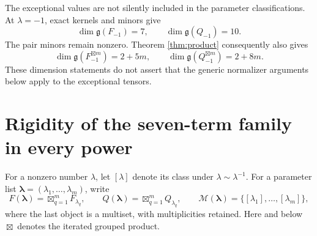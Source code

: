 \documentclass[11pt]{article}
\theoremstyle{remark}\newtheorem{remark}[theorem]{Remark}
\newcommand{\gp}{\boxtimes}
\newcommand{\biggp}{\mathop{\boxtimes}}
\newcommand{\g}{\mathfrak g}
\newcommand{\mc}{\mathcal M}
\begin{document}
The exceptional values are not silently included in the parameter classifications. At $\lambda=-1$, exact kernels and minors give
\[
 \dim\g(F_{-1})=7,\qquad \dim\g(Q_{-1})=10.
\]
The pair minors remain nonzero. Theorem \ref{thm:product} consequently also gives
\[
 \dim\g(F_{-1}^{\gp m})=2+5m,\qquad
 \dim\g(Q_{-1}^{\gp m})=2+8m.
\]
These dimension statements do not assert that the generic normalizer arguments below apply to the exceptional tensors.

\section{Rigidity of the seven-term family in every power}\label{sec:F}
For a nonzero number $\lambda$, let $[\lambda]$ denote its class under $\lambda\sim\lambda^{-1}$. For a parameter list $\boldsymbol\lambda=(\lambda_1,\ldots,\lambda_m)$, write
\[
 F(\boldsymbol\lambda)=\biggp_{q=1}^m F_{\lambda_q},\qquad
 Q(\boldsymbol\lambda)=\biggp_{q=1}^m Q_{\lambda_q},\qquad
 \mc(\boldsymbol\lambda)=\{[\lambda_1],\ldots,[\lambda_m]\},
\]
where the last object is a multiset, with multiplicities retained. Here and below $\biggp$ denotes the iterated grouped product.
\end{document}
